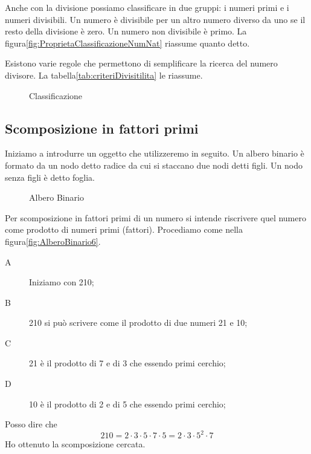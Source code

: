 Anche con la divisione possiamo classificare in due gruppi: i numeri primi e i numeri divisibili. Un numero è divisibile per un altro numero diverso da uno se il resto della divisione è zero. Un numero non divisibile è primo. La figura\nobs\vref{fig:ProprietaClassificazioneNumNat} riassume quanto detto.

Esistono varie regole che permettono di semplificare la ricerca del numero divisore. La tabella\nobs\vref{tab:criteriDivisitilita} le riassume.
\begin{figure} %
	\centering

	\caption{Classificazione}
	\label{fig:ProprietaClassificazioneNumNat}
\end{figure}
\subsection{Scomposizione in fattori primi}
Iniziamo a introdurre un oggetto che utilizzeremo in seguito. Un albero binario è formato da un nodo detto radice da cui si staccano due nodi detti figli. Un nodo senza figli è detto foglia.  
\begin{figure} %
	\centering

	\caption{Albero Binario}
	\label{fig:AlberoBinarioDef}
\end{figure}

Per scomposizione in fattori primi  di un numero si intende riscrivere quel numero come prodotto di numeri primi (fattori). Procediamo come nella figura\nobs\vref{fig:AlberoBinario6}. 
\begin{description}
\item[A] Iniziamo con \num{210};
\item[B] \num{210} si può scrivere come il prodotto di due numeri \num{21} e \num{10};
\item[C] \num{21} è  il prodotto di  \num{7} e di \num{3} che essendo primi cerchio;
\item[D] \num{10} è il prodotto di  \num{2} e di \num{5} che essendo primi cerchio;
\end{description}
Posso dire che \[210=2\cdot 3\cdot 5 \cdot 7 \cdot5 =2\cdot 3\cdot 5^2 \cdot 7\] Ho ottenuto la scomposizione cercata.

